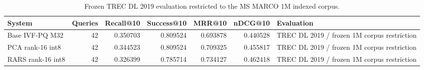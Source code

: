 \begin{table}[t]
\caption{Frozen TREC DL 2019 evaluation restricted to the MS MARCO 1M indexed corpus.}
\label{tab:rars-external-systems}
\begin{tabular}{lrrrrrl}
\toprule
System & Queries & Recall@10 & Success@10 & MRR@10 & nDCG@10 & Evaluation \\
\midrule
Base IVF-PQ M32 & 42 & 0.350703 & 0.809524 & 0.693878 & 0.440528 & TREC DL 2019 / frozen 1M corpus restriction \\
PCA rank-16 int8 & 42 & 0.344523 & 0.809524 & 0.709325 & 0.455817 & TREC DL 2019 / frozen 1M corpus restriction \\
RARS rank-16 int8 & 42 & 0.326399 & 0.785714 & 0.734127 & 0.462418 & TREC DL 2019 / frozen 1M corpus restriction \\
\bottomrule
\end{tabular}
\end{table}
